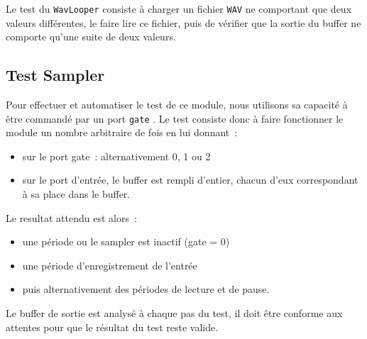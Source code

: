 Le test du \verb!WavLooper! consiste à charger un fichier
\verb!WAV! ne comportant que deux valeurs différentes, le faire
lire ce fichier, puis de vérifier que la sortie du buffer ne
comporte qu'une suite de deux valeurs.

\subsection{Test Sampler}
Pour effectuer et automatiser le test de ce module, nous utilisons sa capacité à être commandé par un port \texttt{gate}
. Le test consiste donc à faire fonctionner le module un nombre arbitraire de fois en lui donnant~: 
\begin{itemize}
    \item sur le port gate~: alternativement 0, 1 ou 2
    \item sur le port d'entrée, le buffer est rempli d'entier, chacun d'eux correspondant à sa place dans le buffer.
\end{itemize}
Le resultat attendu est alors~:
\begin{itemize}
    \item une période ou le sampler est inactif (gate = 0)
    \item une période d'enregistrement de l'entrée
    \item puis alternativement des périodes de lecture et de pause.
\end{itemize}

Le buffer de sortie est analysé à chaque pas du test, il doit être conforme aux attentes pour que le résultat du test reste valide.
